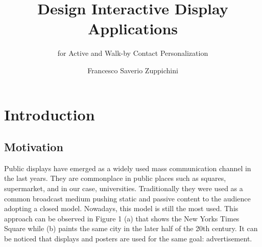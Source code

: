 \documentclass[]{usiinfbachelorproject}
\author{Francesco Saverio Zuppichini}
\title{Design Interactive Display Applications}
\subtitle{for Active and Walk-by Contact Personalization}
\begin{document}
\maketitle

\tableofcontents
\newpage
\section{Introduction}
\subsection{Motivation}

Public displays have emerged as a widely used mass communication channel in the last years. They are commonplace in public places such as squares, supermarket, and in our case, universities. 
Traditionally they were used as a common broadcast medium pushing static and passive content to the audience adopting a closed model. Nowadays, this model is still the most used. This approach can be observed in Figure 1 (a) that shows the New Yorks Times Square while (b) paints the same city in the later half of the 20th century. It can be noticed that displays and posters are used for the same goal: advertisement.
\end{document}

